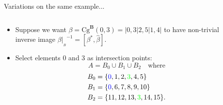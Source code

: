 \documentclass[xcolor=dvipsnames,9pt]{beamer}
\newcommand{\bB}{\ensuremath{\mathbf{B}}}
\newcommand{\resB}{\ensuremath{|_{_B}}}
\newcommand{\Cg}{\ensuremath{\mathrm{Cg}}}
\newcommand{\<}{\langle}	     %
\renewcommand{\>}{\rangle}	     %
\begin{document}
\begin{frame}[fragile,label=OAEx2,shrink=5]{Variations on the same example... }

  \begin{columns}
    \begin{column}{0.7\textwidth}
      \begin{itemize}
      \item 
        Suppose we want $\beta = \Cg^\bB(0,3) =| 0, 3 | 2, 5 | 1, 4 |$ to 
        \vskip4pt
        have non-trivial inverse image $\beta\resB^{-1} = [\beta^*, \widehat{\beta}]$.  
        \vskip6pt
      \item<2-> Select elements 0 and 3 as intersection points:
        \[
        A = B_0 \cup B_1 \cup B_2 \quad \text{where}
        \]
        \begin{align*}
          B_0 &= \{{\color{blue} 0}, 1,  2,  {\color{green}3},  4,  5\}\\
          B_1 &= \{{\color{blue} 0}, 6,  7,  8,  9, 10\}\\
          B_2 &= \{11, 12, 13, {\color{green}3}, 14, 15\}.
        \end{align*}
      \end{itemize}
    \end{column}
    \begin{column}{0.3\textwidth}

    \end{column}

  \end{columns}

  \vskip-5mm

  \begin{columns}
    \begin{column}{0.3\textwidth}

\end{column}
\end{columns}
\end{frame}
\end{document}
